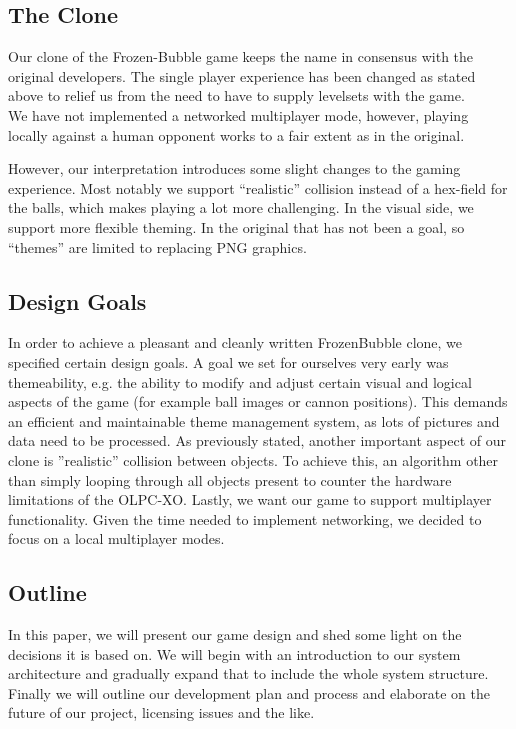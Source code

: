 \subsection{The Clone}
Our clone of the Frozen-Bubble game keeps the name in consensus with the original developers.
The single player experience has been changed as stated above to relief us from the need 
to have to supply levelsets with the game.\\
We have not implemented a networked multiplayer mode, however, playing locally against 
a human opponent works to a fair extent as in the original.

However, our interpretation introduces some slight changes to the gaming experience.
Most notably we support ``realistic'' collision instead of a hex-field for the balls, which
makes playing a lot more challenging. In the visual side, we support more flexible theming.
In the original that has not been a goal, so ``themes'' are limited to replacing 
PNG graphics.
%
\subsection{Design Goals}
In order to achieve a pleasant and cleanly written FrozenBubble clone, we specified certain design goals.
A goal we set for ourselves very early was themeability, e.g. the ability to modify and adjust certain visual and logical aspects of the game (for example ball images or cannon positions). This demands an efficient and maintainable theme management system, as lots of pictures and data need to be processed.
As previously stated, another important aspect of our clone is ''realistic'' collision between objects. To achieve this, an algorithm other than simply looping through all objects present to counter the hardware limitations of the OLPC-XO.
Lastly, we want our game to support multiplayer functionality. Given the time needed to implement networking, we decided to focus on a local multiplayer modes.

%
\subsection{Outline}
In this paper, we will present our game design and shed some light on the decisions 
it is based on. We will begin with an introduction to our system architecture and 
gradually expand that to include the whole system structure.\\
Finally we will outline our development plan and process and elaborate on the 
future of our project, licensing issues and the like.
%
